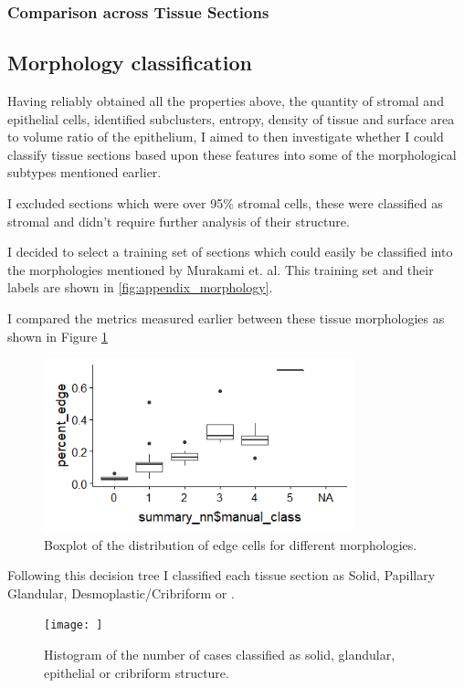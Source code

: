 \subsubsection{Comparison across Tissue Sections}


\subsection{Morphology classification}
Having reliably obtained all the properties above, the quantity of stromal and epithelial cells, identified subclusters, entropy, density of tissue and surface area to volume ratio of the epithelium, I aimed to then investigate whether I could classify tissue sections based upon these features into some of the morphological subtypes mentioned earlier.

I excluded sections which were over 95\% stromal cells, these were classified as stromal and didn't  require further analysis of their structure. 

I decided to select a training set of sections which could easily be classified into the morphologies mentioned by Murakami et. al.  This training set and their labels are shown in \ref{fig:appendix_morphology}.

I compared the metrics measured earlier between these tissue morphologies as shown in Figure \ref{fig:morph_edge}

\begin{figure}
    \centering
    \includegraphics[width=0.8\textwidth]{Chapter3/manual_class_edge_cells.png}
    \caption{Boxplot of the distribution of edge cells for different morphologies.}
    \label{fig:morph_edge}
\end{figure}

Following this decision tree I classified each tissue section as Solid, Papillary Glandular, Desmoplastic/Cribriform or . 

\begin{figure}
    \centering
    \texttt{[image: ]}
    \caption{Histogram of the number of cases classified as solid, glandular, epithelial  or cribriform structure.}
    \label{fig:num_classl}
\end{figure}



